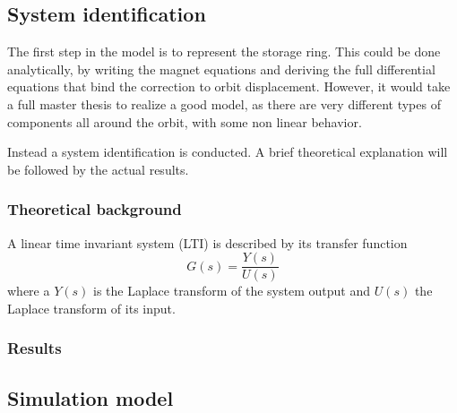 \subsection{System identification}
The first step in the model is to represent the storage ring. This could be done analytically, by writing the magnet equations and deriving the full differential equations that bind the correction to orbit displacement. However, it would take a full master thesis to realize a good model, as there are very different types of components all around the orbit, with some non linear behavior.

Instead a system identification is conducted. A brief theoretical explanation will be followed by the actual results.

\subsubsection{Theoretical background}
A linear time invariant system (LTI) is described by its transfer function
\begin{equation}
	G(s) = \frac{Y(s)}{U(s)}
\end{equation}
where a $Y(s)$ is the Laplace transform of the system output and $U(s)$ the Laplace transform of its input.

\subsubsection{Results}
\subsection{Simulation model}

